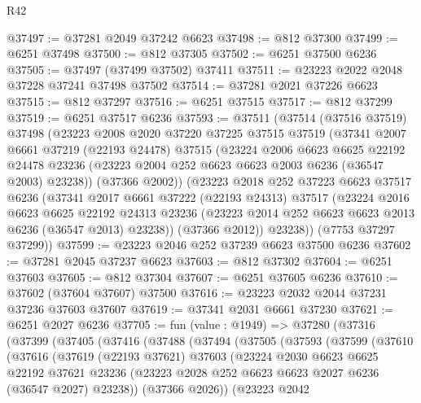 \begin{lexlean}{R42}
\begin{coremodule}
{@37497 := @37281 @2049 @37242 @6623
@37498 := @812 @37300
@37499 := @6251 @37498
@37500 := @812 @37305
@37502 := @6251 @37500 @6236
@37505 := @37497 (@37499 @37502) @37411
@37511 := @23223 @2022 @2048 @37228 @37241 @37498 @37502
@37514 := @37281 @2021 @37226 @6623
@37515 := @812 @37297
@37516 := @6251 @37515
@37517 := @812 @37299
@37519 := @6251 @37517 @6236
@37593 := @37511
    (@37514
      (@37516 @37519)
      @37498
      (@23223
        @2008
        @2020
        @37220
        @37225
        @37515
        @37519
        (@37341
          @2007
          @6661
          @37219
          (@22193 @24478)
          @37515
          (@23224
            @2006
            @6623
            @6625
            @22192
            @24478
            @23236
            (@23223 @2004 @252 @6623 @6623 @2003 @6236 (@36547 @2003) @23238))
          (@37366 @2002))
        (@23223
          @2018
          @252
          @37223
          @6623
          @37517
          @6236
          (@37341
            @2017
            @6661
            @37222
            (@22193 @24313)
            @37517
            (@23224
              @2016
              @6623
              @6625
              @22192
              @24313
              @23236
              (@23223 @2014 @252 @6623 @6623 @2013 @6236 (@36547 @2013) @23238))
            (@37366 @2012))
          @23238))
      (@7753 @37297 @37299))
@37599 := @23223 @2046 @252 @37239 @6623 @37500 @6236
@37602 := @37281 @2045 @37237 @6623
@37603 := @812 @37302
@37604 := @6251 @37603
@37605 := @812 @37304
@37607 := @6251 @37605 @6236
@37610 := @37602 (@37604 @37607) @37500
@37616 := @23223 @2032 @2044 @37231 @37236 @37603 @37607
@37619 := @37341 @2031 @6661 @37230
@37621 := @6251 @2027 @6236
@37705 := fun (value : @1949) =>
  @37280
    (@37316
      (@37399
        (@37405
          (@37416
            (@37488
              (@37494
                (@37505
                  (@37593
                    (@37599
                      (@37610
                        (@37616
                          (@37619
                            (@22193 @37621)
                            @37603
                            (@23224
                              @2030
                              @6623
                              @6625
                              @22192
                              @37621
                              @23236
                              (@23223 @2028 @252 @6623 @6623 @2027 @6236 (@36547 @2027) @23238))
                            (@37366 @2026))
                          (@23223
                            @2042
}
\end{coremodule}
\end{lexlean}
